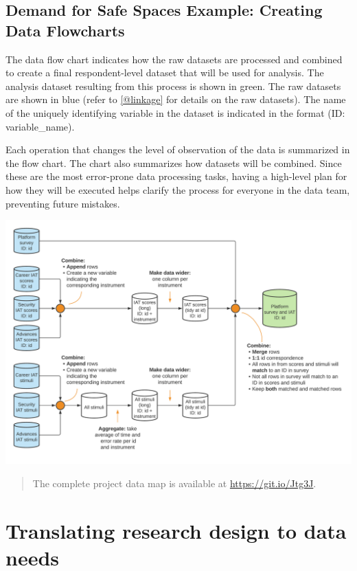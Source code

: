 \documentclass[
]{book}
\begin{document}
\begin{ex}
\hypertarget{demand-for-safe-spaces-example-creating-data-flowcharts}{%
\subsection{Demand for Safe Spaces Example: Creating Data Flowcharts}\label{demand-for-safe-spaces-example-creating-data-flowcharts}}

The data flow chart indicates how the raw datasets are processed and combined to create a final respondent-level dataset that will be used for analysis. The analysis dataset resulting from this process is shown in green. The raw datasets are shown in blue (refer to \ref{@linkage} for details on the raw datasets). The name of the uniquely identifying variable in the dataset is indicated in the format (ID: variable\_name).

Each operation that changes the level of observation of the data is summarized in the flow chart. The chart also summarizes how datasets will be combined. Since these are the most error-prone data processing tasks, having a high-level plan for how they will be executed helps clarify the process for everyone in the data team, preventing future mistakes.

\includegraphics{examples/data-flow-chart.png}

\begin{quote}
The complete project data map is available at \url{https://git.io/Jtg3J}.
\end{quote}
\end{ex}

\hypertarget{translating-research-design-to-data-needs}{%
\section*{Translating research design to data needs}\label{translating-research-design-to-data-needs}}
\end{document}
